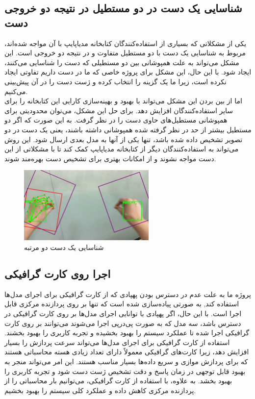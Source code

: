 \subsection{شناسایی یک دست در دو مستطیل در نتیجه دو خروجی دست}
یکی از مشکلاتی که بسیاری از استفاده‌کنندگان کتابخانه مدیاپایپ با آن مواجه شده‌اند، مربوط به شناسایی یک دست با دو مستطیل متفاوت و در نتیجه دو خروجی است. این مشکل می‌تواند به علت همپوشانی بین دو مستطیلی که دست را 
شناسایی می‌کنند، ایجاد شود. با این حال، این مشکل برای پروژه خاصی که ما در دست داریم تفاوتی ایجاد نکرده است، زیرا ما یک گزینه را انتخاب کرده و ژست دست را در آن پیش‌بینی می‌کنیم.
\\
اما از بین بردن این مشکل می‌تواند با بهبود و بهینه‌سازی کارایی این کتابخانه را برای سایر استفاده‌کنندگان افزایش دهد. برای حل این مشکل، می‌توان محدودیتی برای همپوشانی مستطیل‌های حاوی دست را در نظر گرفت. به این صورت که اگر دو مستطیل بیشتر از حد در نظر گرفته شده 
همپوشانی داشته باشند، یعنی یک دست در دو تصویر تشخیص داده شده باشد، تنها یکی از آنها به مدل بعدی ارسال شود. این روش می‌تواند به استفاده‌کنندگان دیگر از کتابخانه مدیاپایپ کمک کند تا با مشکلاتی از این دست مواجه نشوند و از امکانات بهتری برای تشخیص دست بهره‌مند شوند.

\begin{figure}[h]
    \centering
    \includegraphics[width=0.6\textwidth]{multi_boxes.png}
    \caption{شناسایی یک دست دو مرتبه}
\end{figure}


\subsection{اجرا روی کارت گرافیکی \protect{}}
پروژه ما  به علت عدم در دسترس بودن پهپادی که از کارت گرافیکی برای اجرای مدل‌ها استفاده کند, به صورتی پیاده‌سازی شده است که تنها بر روی پردازنده مرکزی قابل اجرا است. با این حال، اگر پهپادی با توانایی اجرای مدل‌ها بر روی 
کارت گرافیکی در دسترس باشد، سه مدل که به صورت پی‌در‌پی اجرا می‌شوند می‌توانند بر روی کارت گرافیکی اجرا شده تا عملکرد سیستم را بهبود بخشیده و تجربه کاربری را بهبود بخشند. استفاده از کارت گرافیکی برای اجرای مدل‌ها می‌تواند 
سرعت پردازش را بسیار افزایش دهد، زیرا کارت‌های گرافیکی معمولاً دارای تعداد زیادی هسته محاسباتی هستند که برای پردازش موازی و سریع داده‌ها بسیار مناسب هستند. این امر می‌تواند منجر به بهبود قابل توجهی در زمان پاسخ و دقت 
تشخیص ژست دست شود و تجربه کاربری را بهبود بخشد. به علاوه، با استفاده از کارت گرافیکی، می‌توانیم بار محاسباتی را از پردازنده مرکزی کاهش داده و عملکرد کلی سیستم را بهبود بخشیم.

